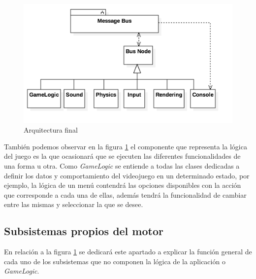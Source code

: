 \begin{figure}
	\includegraphics[width=15cm]{otros/UML/png/final_arq.png}
	\caption{Arquitectura final}
	\label{dia:arquitectura_final}
\end{figure}

\bigskip

También podemos observar en la figura \ref{dia:arquitectura_final} el componente que representa la lógica del juego es la que ocasionará que se ejecuten las diferentes funcionalidades de una forma u otra. Como \textit{GameLogic} se entiende a todas las clases dedicadas a definir los datos y comportamiento del videojuego en un determinado estado, por ejemplo, la lógica de un menú contendrá las opciones disponibles con la acción que corresponde a cada una de ellas, además tendrá la funcionalidad de cambiar entre las mismas y seleccionar la que se desee.

\bigskip

\subsection{Subsistemas propios del motor}

En relación a la figura \ref{dia:arquitectura_final} se dedicará este apartado a explicar la función general de cada uno de los subsistemas que no componen la lógica de la aplicación o \textit{GameLogic}.

